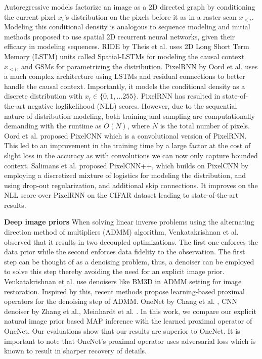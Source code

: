 \documentclass[journal,twoside]{IEEEtran}
\begin{document}
Autoregressive models factorize an image as a 2D directed graph by conditioning the current pixel $x_i$'s distribution on the pixels before it as in a raster scan $x_{<i}$. Modeling this conditional density is analogous to sequence modeling and initial methods proposed to use spatial 2D recurrent neural networks, given their efficacy in modeling sequences. RIDE by Theis et al. \cite{theis2015generative} uses 2D Long Short Term Memory (LSTM) units called Spatial-LSTMs for modeling the causal context $x_{<i}$, and GSMs for parametrizing the distribution. PixelRNN by Oord et al. \cite{van2016pixel} uses a much complex architecture using LSTMs and residual connections to better handle the causal context. Importantly, it models the conditional density as a discrete distribution with $x_i \in \{0, 1, \ldots 255\}$. PixelRNN has resulted in state-of-the-art negative loglikelihood (NLL) scores. However, due to the sequential nature of distribution modeling, both training and sampling are computationally demanding with the runtime as $O(N)$, where $N$ is the total number of pixels. Oord et al. proposed PixelCNN which is a convolutional version of PixelRNN. This led to an improvement in
the training time by a large factor at the cost of slight loss in the accuracy as with convolutions we can now only capture bounded context. Salimans et al. \cite{salimans2017pixelcnn++} proposed PixelCNN++, which builds on PixelCNN by employing a discretized mixture of logistics for modeling the distribution, and using drop-out regularization, and additional skip connections. It improves on the NLL score over PixelRNN on the CIFAR dataset leading to state-of-the-art results. 


\textbf{Deep image priors} When solving linear inverse problems using the alternating direction method of multipliers (ADMM) algorithm, Venkatakrishnan et al. \cite{venkatakrishnan2013plug} observed that it results in two decoupled optimizations. The first one enforces the data prior while the second enforces data fidelity to the observation. The first step can be thought of as a denoising problem, thus, a denoiser can be employed to solve this step thereby avoiding the need for an explicit image prior. Venkatakrishnan et al. \cite{venkatakrishnan2013plug} use denoisers like BM3D \cite{dabov2009bm3d} in ADMM setting for image restoration. Inspired by this, recent methods propose learning-based proximal operators for the denoising step of ADMM. OneNet by Chang et al. \cite{chang2017one}, CNN denoiser by Zhang et al.\cite{zhang2017learning}, Meinhardt et al.  \cite{meinhardt2017learning} . In this work, we compare our explicit natural image prior based MAP inference with the learned proximal operator of OneNet. Our evaluations show that our results are superior to OneNet. It is important to note that OneNet's proximal operator uses adversarial loss \cite{goodfellow2014generative} which is known to result in sharper recovery of details.
\end{document}
